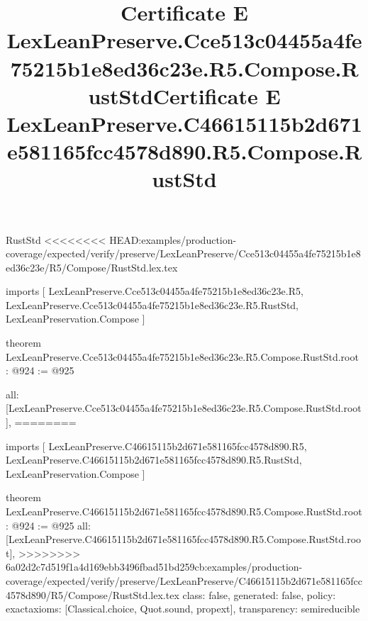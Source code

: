 \begin{lexlean}{RustStd}
<<<<<<<< HEAD:examples/production-coverage/expected/verify/preserve/LexLeanPreserve/Cce513c04455a4fe75215b1e8ed36c23e/R5/Compose/RustStd.lex.tex
\title{Certificate E LexLeanPreserve.Cce513c04455a4fe75215b1e8ed36c23e.R5.Compose.RustStd}
\begin{coremodule}
imports [
  LexLeanPreserve.Cce513c04455a4fe75215b1e8ed36c23e.R5,
  LexLeanPreserve.Cce513c04455a4fe75215b1e8ed36c23e.R5.RustStd,
  LexLeanPreservation.Compose
]

theorem LexLeanPreserve.Cce513c04455a4fe75215b1e8ed36c23e.R5.Compose.RustStd.root : @924 := @925 {
  all: [LexLeanPreserve.Cce513c04455a4fe75215b1e8ed36c23e.R5.Compose.RustStd.root],
========
\title{Certificate E LexLeanPreserve.C46615115b2d671e581165fcc4578d890.R5.Compose.RustStd}
\begin{coremodule}
imports [
  LexLeanPreserve.C46615115b2d671e581165fcc4578d890.R5,
  LexLeanPreserve.C46615115b2d671e581165fcc4578d890.R5.RustStd,
  LexLeanPreservation.Compose
]

theorem LexLeanPreserve.C46615115b2d671e581165fcc4578d890.R5.Compose.RustStd.root : @924 := @925 {
  all: [LexLeanPreserve.C46615115b2d671e581165fcc4578d890.R5.Compose.RustStd.root],
>>>>>>>> 6a02d2c7d519f1a4d169ebb3496fbad51bd259cb:examples/production-coverage/expected/verify/preserve/LexLeanPreserve/C46615115b2d671e581165fcc4578d890/R5/Compose/RustStd.lex.tex
  class: false,
  generated: false,
  policy: exact{axioms: [Classical.choice, Quot.sound, propext]},
  transparency: semireducible
}


\end{coremodule}}
\end{coremodule}
\end{lexlean}
